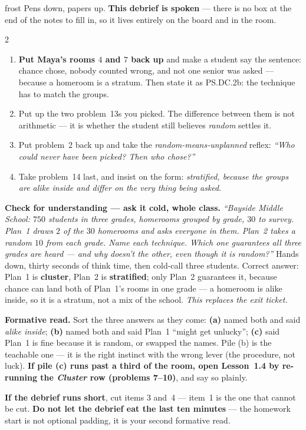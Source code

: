 \documentclass[10pt]{article}
\begin{document}
\boxguard[24]
\begin{skillbox}{frost}
Pens down, papers up. \textbf{This debrief is spoken} --- there is no box at the end of the
notes to fill in, so it lives entirely on the board and in the room.
\begin{multicols}{2}
\begin{enumerate}[leftmargin=1.3em, nosep, itemsep=3pt]
  \item \textbf{Put Maya's rooms $4$ and $7$ back up} and make a student say the sentence:
        chance chose, nobody counted wrong, and not one senior was asked --- because a homeroom
        is a stratum. Then state it as PS.DC.2b: the technique has to match the groups.
  \item Put up the two problem~13s you picked. The difference between them is
        not arithmetic --- it is whether the student still believes \emph{random} settles it.
  \item Put problem~2 back up and take the \emph{random-means-unplanned} reflex:
        \emph{``Who could never have been picked? Then who chose?''}
  \item Take problem~14 last, and insist on the form: \emph{stratified, because the groups are
        alike inside and differ on the very thing being asked}.
\end{enumerate}
\columnbreak
\textbf{Check for understanding --- ask it cold, whole class.} \emph{``Bayside Middle School:
$750$ students in three grades, homerooms grouped by grade, $30$ to survey. Plan~1 draws $2$
of the $30$ homerooms and asks everyone in them. Plan~2 takes a random $10$ from each grade.
Name each technique. Which one guarantees all three grades are heard --- and why doesn't the
other, even though it is random?''} Hands down, thirty seconds of think time, then cold-call
three students. Correct answer: Plan~1 is \textbf{cluster}, Plan~2 is \textbf{stratified};
only Plan~2 guarantees it, because chance can land both of Plan~1's rooms in one grade --- a
homeroom is alike inside, so it is a stratum, not a mix of the school. \emph{This replaces the
exit ticket.}

\textbf{Formative read.} Sort the three answers as they come: \textbf{(a)} named both and said
\emph{alike inside}; \textbf{(b)} named both and said Plan~1 ``might get unlucky''; \textbf{(c)}
said Plan~1 is fine because it is random, or swapped the names. Pile (b) is the teachable one
--- it is the right instinct with the wrong lever (the procedure, not luck). \textbf{If pile
(c) runs past a third of the room, open Lesson~1.4 by re-running the \emph{Cluster} row
(problems 7--10)}, and say so plainly.

\textbf{If the debrief runs short}, cut items 3 and~4 --- item~1 is the one that cannot be
cut. \textbf{Do not let the debrief eat the last ten minutes} --- the homework start is not
optional padding, it is your second formative read.
\end{multicols}
\end{skillbox}
\end{document}

